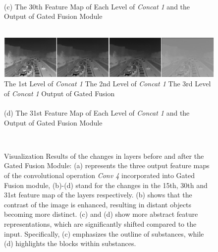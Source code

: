 \documentclass[lettersize,journal]{IEEEtran}
\begin{document}
\begin{figure}[pht]
    \quad \\
    
    (c) The 30th Feature Map of Each Level of \textit{Concat 1} and the Output of Gated Fusion Module

    \quad \\
    
    \includegraphics[width=\textwidth]{res31.jpg}
    The 1st Level of \textit{Concat 1} \quad The 2nd Level of \textit{Concat 1} \quad The 3rd Level of \textit{Concat 1} \quad\;\;\; Output of Gated Fusion\\

    \quad \\
    
    (d) The 31st Feature Map of Each Level of \textit{Concat 1} and the Output of Gated Fusion Module

    \quad \\
    
    \caption{Visualization Results of the changes in layers before and after the Gated Fusion Module: (a) represents the three output feature maps of the convolutional operation \textit{Conv 4} incorporated into Gated Fusion module, (b)-(d) stand for the changes in the 15th, 30th and 31st feature map of the layers respectively. (b) shows that the contrast of the image is enhanced, resulting in distant objects becoming more distinct. (c) and (d) show more abstract feature representations, which are significantly shifted compared to the input. Specifically, (c) emphasizes the outline of substances, while (d) highlights the blocks within substances.}
    \label{visual}
\end{figure}
    
\end{document}
